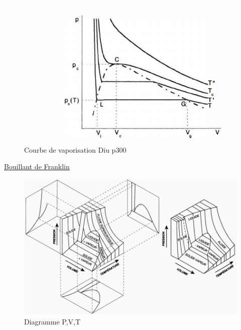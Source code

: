 \documentclass[10pt]{beamer}
\begin{document}
\begin{frame}{\insertsubsection}
    \begin{figure}
        \centering
        \includegraphics[width=.8\textwidth]{Isotherme_courbe_vaporisation.png}
        \caption{Courbe de vaporisation Diu p300}
    \end{figure}
    \href{https://www.youtube.com/watch?v=nxAdQ_8tC1U&ab_channel=Unisciel}{Bouillant de Franklin}

\end{frame}

\begin{frame}{\insertsubsection}
    \begin{figure}
        \centering
        \includegraphics[width=1\textwidth]{DiagrammePVT.png}
        \caption{Diagramme P,V,T}
    \end{figure}
\end{frame}
\end{document}
